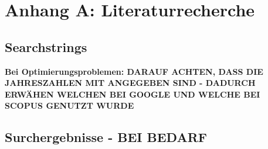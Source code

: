 \chapter{Anhang A: Literaturrecherche}
\section{Searchstrings}

\textbf{Bei Optimierungsproblemen: DARAUF ACHTEN, DASS DIE JAHRESZAHLEN MIT ANGEGEBEN SIND - DADURCH ERWÄHEN WELCHEN BEI GOOGLE UND WELCHE BEI SCOPUS GENUTZT WURDE}

\section{Surchergebnisse - BEI BEDARF}

